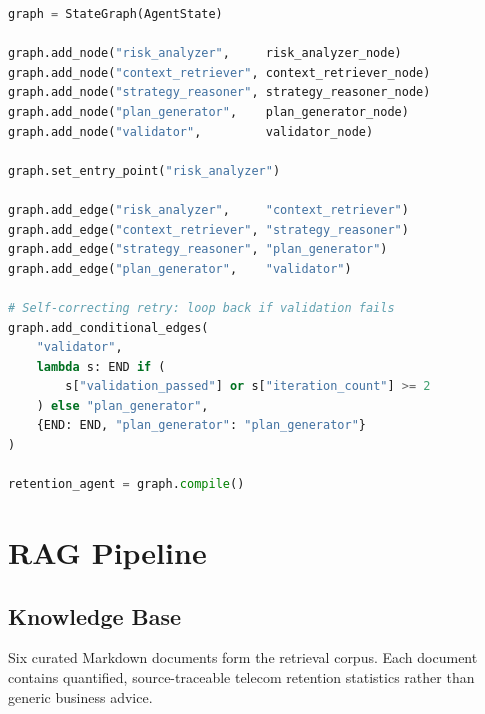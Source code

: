 \documentclass[11pt]{article}
\begin{document}
\begin{lstlisting}[language=Python,
  caption={LangGraph StateGraph definition and conditional retry edge
           (\texttt{backend/workflows/retention\_graph.py}).}]
graph = StateGraph(AgentState)

graph.add_node("risk_analyzer",     risk_analyzer_node)
graph.add_node("context_retriever", context_retriever_node)
graph.add_node("strategy_reasoner", strategy_reasoner_node)
graph.add_node("plan_generator",    plan_generator_node)
graph.add_node("validator",         validator_node)

graph.set_entry_point("risk_analyzer")

graph.add_edge("risk_analyzer",     "context_retriever")
graph.add_edge("context_retriever", "strategy_reasoner")
graph.add_edge("strategy_reasoner", "plan_generator")
graph.add_edge("plan_generator",    "validator")

# Self-correcting retry: loop back if validation fails
graph.add_conditional_edges(
    "validator",
    lambda s: END if (
        s["validation_passed"] or s["iteration_count"] >= 2
    ) else "plan_generator",
    {END: END, "plan_generator": "plan_generator"}
)

retention_agent = graph.compile()
\end{lstlisting}

\section{RAG Pipeline}
\label{sec:rag}

\subsection{Knowledge Base}

Six curated Markdown documents form the retrieval corpus. Each document
contains quantified, source-traceable telecom retention statistics rather than
generic business advice.
\end{document}
